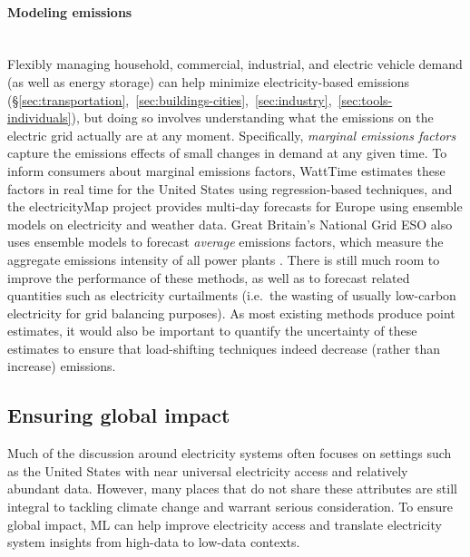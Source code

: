 \documentclass[11pt]{report}
\begin{document}
\paragraph{Modeling emissions}
\mbox{}\\\label{subsec:electricity-systems-modeling-emissions}Flexibly managing household, commercial, industrial, and electric vehicle demand (as well as energy storage) can help minimize electricity-based emissions (\S\ref{sec:transportation},~\ref{sec:buildings-cities},~\ref{sec:industry},~\ref{sec:tools-individuals}), but doing so involves understanding what the emissions on the electric grid actually are at any moment. Specifically, \emph{marginal emissions factors} capture the emissions effects of small changes in demand at any given time. To inform consumers about marginal emissions factors, WattTime \cite{watttime} estimates these factors in real time for the United States using regression-based techniques, and the electricityMap project \cite{electricitymap} provides multi-day forecasts for Europe using ensemble models on electricity and weather data. 
Great Britain's National Grid ESO also uses ensemble models to forecast \emph{average} emissions factors, which measure the aggregate emissions intensity of all power plants \cite{carbonintensityapi}. There is still much room to improve the performance of these methods, as well as to forecast related quantities such as electricity curtailments (i.e.~the wasting of usually low-carbon electricity for grid balancing purposes). As most existing methods produce point estimates, it would also be important to quantify the uncertainty of these estimates to ensure that load-shifting techniques indeed decrease (rather than increase) emissions.

\subsection{Ensuring global impact}
\label{sec:electricity-developing}

Much of the discussion around electricity systems often focuses on settings such as the United States with near universal electricity access and relatively abundant data. However, many places that do not share these attributes are still integral to tackling climate change \cite{ipcc2014summary} and warrant serious consideration. To ensure global impact, ML can help improve electricity access and translate electricity system insights from high-data to low-data contexts.
\end{document}
